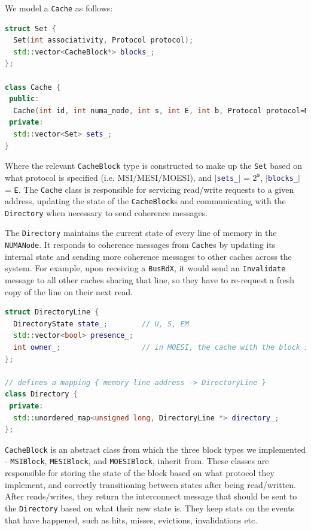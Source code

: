 \documentclass{article}
\def\inline{\lstinline[language=C++, basicstyle=\ttfamily]}
\begin{document}
We model a \inline{Cache} as follows:
\begin{lstlisting}[language=C++]
struct Set {
  Set(int associativity, Protocol protocol);
  std::vector<CacheBlock*> blocks_;
};

class Cache {
 public:
  Cache(int id, int numa_node, int s, int E, int b, Protocol protocol=MESI);
 private:
  std::vector<Set> sets_;
}
\end{lstlisting}

Where the relevant \inline{CacheBlock} type is constructed to make up the \inline{Set} based on what protocol is specified (i.e. MSI/MESI/MOESI), and $|$\inline{sets_}$|$  = $2^\texttt{s}$, $|$\inline{blocks_}$|$  = \inline{E}.  The \inline{Cache} class is responsible for servicing read/write requests to a given address, updating the state of the \inline{CacheBlock}s and communicating with the \inline{Directory} when necessary to send coherence messages.

The \inline{Directory} maintains the current state of every line of memory in the \inline{NUMANode}.  It responds to coherence messages from \inline{Cache}s by updating its internal state and sending more coherence messages to other caches across the system. For example, upon receiving a \inline{BusRdX}, it would send an \inline{Invalidate} message to all other caches sharing that line, so they have to re-request a fresh copy of the line on their next read.
\begin{lstlisting}[language=C++]
struct DirectoryLine {
  DirectoryState state_;        // U, S, EM
  std::vector<bool> presence_;
  int owner_;                   // in MOESI, the cache with the block in O state
};

// defines a mapping { memory line address -> DirectoryLine }
class Directory {
 private:
  std::unordered_map<unsigned long, DirectoryLine *> directory_;
};
\end{lstlisting}

\inline{CacheBlock} is an abstract class from which the three block types we implemented - \inline{MSIBlock}, \inline{MESIBlock}, and \inline{MOESIBlock}, inherit from.  These classes are responsible for storing the state of the block based on what protocol they implement, and correctly transitioning between states after being read/written. After reads/writes, they return the interconnect message that should be sent to the \inline{Directory} based on what their new state is. They keep stats on the events that have happened, such as hits, misses, evictions, invalidations etc.
\end{document}

